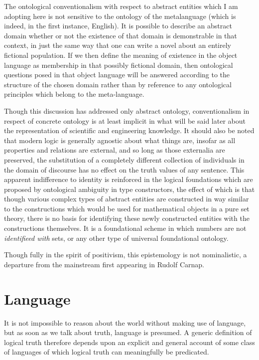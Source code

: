 \documentclass[10pt,titlepage]{book}
\begin{document}
The ontological conventionalism with respect to abstract entities which I am adopting here is not sensitive to the ontology of the metalanguage (which is indeed, in the first instance, English).
It is possible to describe an abstract domain whether or not the existence of that domain is demonstrable in that context, in just the same way that one can write a novel about an entirely fictional population.
If we then define the meaning of existence in the object language as membership in that possibly fictional domain, then ontological questions posed in that object language will be answered according to the structure of the chosen domain rather than by reference to any ontological principles which belong to the meta-language.

Though this discussion has addressed only abstract ontology, conventionalism in respect of concrete ontology is at least implicit in what will be said later about the representation of scientific and engineering knowledge.
It should also be noted that modern logic is generally agnostic about what things are, insofar as all properties and relations are external, and so long as those externalia are preserved, the substitution of a completely different collection of individuals in the domain of discourse has no effect on the truth values of any sentence.
This apparent indifference to identity is reinforced in the logical foundations which are proposed by ontological ambiguity in type constructors, the effect of which is that though various complex types of abstract entities are constructed in way similar to the constructions which would be used for mathematical objects in a pure set theory, there is no basis for identifying these newly constructed entities with the constructions themselves.
It is a foundational scheme in which numbers are not \emph{identifieed with} sets, or any other type of universal foundational ontology.

Though fully in the spirit of positivism, this epistemology is not nominalistic, a departure from the mainstream first appearing in Rudolf Carnap.

\section{Language}

It is not impossible to reason about the world without making use of language, but as soon as we talk about truth, language is presumed.
A generic definition of logical truth therefore depends upon an explicit and general account of some class of languages of which logical truth can meaningfully be predicated.
\end{document}
